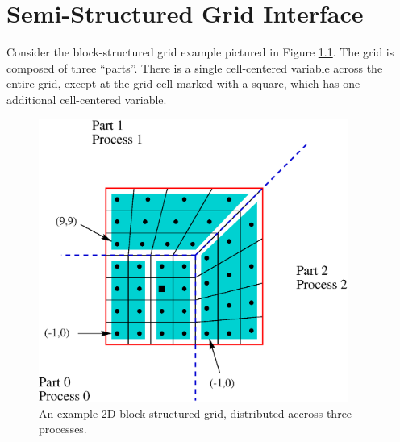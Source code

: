 \chapter{Semi-Structured Grid Interface}
\label{Semi-Structured Grid Interface}

Consider the block-structured grid example pictured in Figure
\ref{fig-block-structured-grid}.  The grid is composed of three
``parts''.  There is a single cell-centered variable across the entire
grid, except at the grid cell marked with a square, which has one
additional cell-centered variable.
\begin{figure}
\centering
\includegraphics[width=4in]{block_structured.eps}
\caption{%
An example 2D block-structured grid, distributed accross three processes.}
\label{fig-block-structured-grid}
\end{figure}

